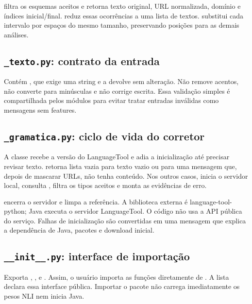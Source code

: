  filtra os esquemas aceitos e retorna texto original, URL normalizada, domínio e índices inicial/final.  reduz essas ocorrências a uma lista de textos.  substitui cada intervalo por espaços do mesmo tamanho, preservando posições para as demais análises.

\subsection{\texttt{\_\allowbreak{}texto.py}: contrato da entrada}
Contém , que exige uma string e a devolve sem alteração. Não remove acentos, não converte para minúsculas e não corrige escrita. Essa validação simples é compartilhada pelos módulos para evitar tratar entradas inválidas como mensagens sem features.

\clearpage
\subsection{\texttt{\_\allowbreak{}gramatica.py}: ciclo de vida do corretor}
A classe  recebe a versão do LanguageTool e adia a inicialização até precisar revisar texto.  retorna lista vazia para texto vazio ou para uma mensagem que, depois de mascarar URLs, não tenha conteúdo. Nos outros casos, inicia o servidor local, consulta , filtra os tipos aceitos e monta as evidências de erro.

 encerra o servidor e limpa a referência. A biblioteca externa é language-tool-python; Java executa o servidor LanguageTool. O código não usa a API pública do serviço. Falhas de inicialização são convertidas em uma mensagem que explica a dependência de Java, pacotes e download inicial.

\subsection{\texttt{\_\allowbreak{}\_\allowbreak{}init\_\allowbreak{}\_\allowbreak{}.py}: interface de importação}
Exporta , ,  e . Assim, o usuário importa as funções diretamente de . A lista  declara essa interface pública. Importar o pacote não carrega imediatamente os pesos NLI nem inicia Java.

